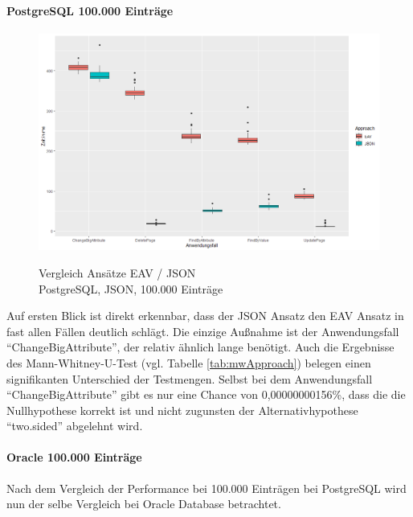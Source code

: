 \paragraph{PostgreSQL 100.000 Einträge}

\begin{figure}[H]
\centering
\includegraphics[scale=0.5]{rStudioPictures/postgres100k1100700.png}
\label{fig:ApproachPostgres100k}
\caption{Vergleich Ansätze EAV / JSON \\ PostgreSQL, JSON, 100.000 Einträge}
\end{figure}

Auf ersten Blick ist direkt erkennbar, dass der JSON Ansatz den EAV Ansatz in fast allen Fällen deutlich schlägt. Die einzige Außnahme ist der Anwendungsfall ``ChangeBigAttribute'', der relativ ähnlich lange benötigt. Auch die Ergebnisse des Mann-Whitney-U-Test (vgl. Tabelle \ref{tab:mwApproach}) belegen einen signifikanten Unterschied der Testmengen. Selbst bei dem Anwendungsfall ``ChangeBigAttribute'' gibt es nur eine Chance von 0,00000000156\%, dass die die Nullhypothese korrekt ist und nicht zugunsten der  Alternativhypothese ``two.sided'' abgelehnt wird.


\paragraph{Oracle 100.000 Einträge}
Nach dem Vergleich der Performance bei 100.000 Einträgen bei PostgreSQL wird nun der selbe Vergleich bei Oracle Database betrachtet.

